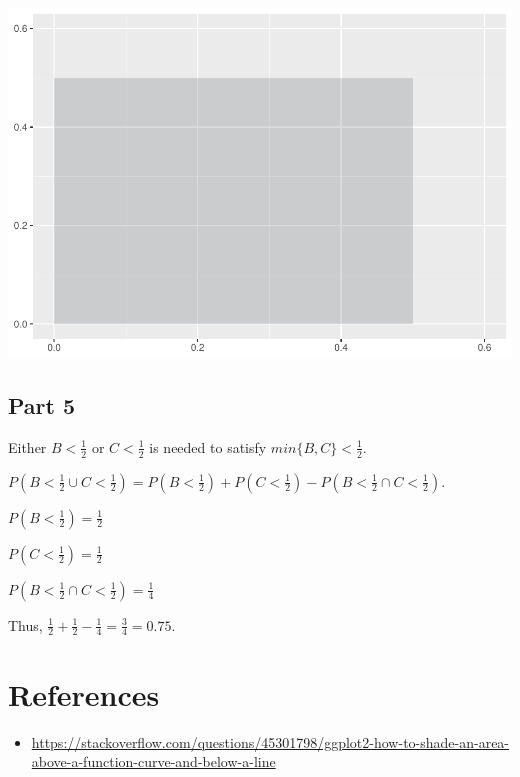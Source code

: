 \documentclass[]{article}
\providecommand{\tightlist}{%
  \setlength{\itemsep}{0pt}\setlength{\parskip}{0pt}}
\begin{document}
\includegraphics{JSturm_Assignment5_files/figure-latex/unnamed-chunk-6-1.pdf}

\subsection{Part 5}\label{part-5-1}

Either \(B < \frac{1}{2}\) or \(C < \frac{1}{2}\) is needed to satisfy
\(min\{B,C\} < \frac{1}{2}\).

\(P(B < \frac{1}{2} \cup C < \frac{1}{2}) = P(B < \frac{1}{2}) + P(C < \frac{1}{2}) - P(B < \frac{1}{2} \cap C < \frac{1}{2})\).

\(P(B < \frac{1}{2}) = \frac{1}{2}\)

\(P(C < \frac{1}{2}) = \frac{1}{2}\)

\(P(B < \frac{1}{2} \cap C < \frac{1}{2}) = \frac{1}{4}\)

Thus, \(\frac{1}{2} + \frac{1}{2} - \frac{1}{4} = \frac{3}{4} = 0.75\).

\section{References}\label{references}

\begin{itemize}
\tightlist
\item
  \url{https://stackoverflow.com/questions/45301798/ggplot2-how-to-shade-an-area-above-a-function-curve-and-below-a-line}
\end{itemize}
\end{document}
